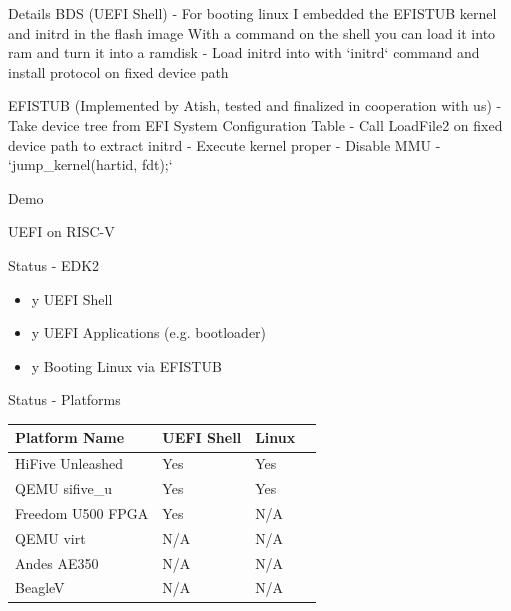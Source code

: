 \documentclass[
  10pt
]{beamer}
\begin{document}
\begin{frame}{Details}
BDS (UEFI Shell)
  - For booting linux I embedded the EFISTUB kernel and initrd in the flash image
    With a command on the shell you can load it into ram and turn it into a ramdisk
  - Load initrd into with `initrd` command and install protocol on fixed device path

EFISTUB (Implemented by Atish, tested and finalized in cooperation with us)
  - Take device tree from EFI System Configuration Table
  - Call LoadFile2 on fixed device path to extract initrd
  - Execute kernel proper
    - Disable MMU
    - `jump\_kernel(hartid, fdt);`


\end{frame}

\begin{frame}{Demo}

\end{frame}

\begin{frame}{UEFI on RISC-V}

\end{frame}

\begin{frame}{Status - EDK2}
  \begin{itemize}
    \item y UEFI Shell
    \item y UEFI Applications (e.g. bootloader)
    \item y Booting Linux via EFISTUB
  \end{itemize}
\end{frame}

\begin{frame}{Status - Platforms}
  \begin{center}
    \begin{tabular}{|l|l|l|l|}
      \hline
      Platform Name     & UEFI Shell & Linux \\
      \hline
      HiFive Unleashed  & Yes        & Yes \\
      QEMU sifive\_u    & Yes        & Yes \\
      Freedom U500 FPGA & Yes        & N/A \\
      QEMU virt         & N/A        & N/A \\
      Andes AE350       & N/A        & N/A \\
      BeagleV           & N/A        & N/A \\
      \hline
    \end{tabular}
  \end{center}
\end{frame}
\end{document}
